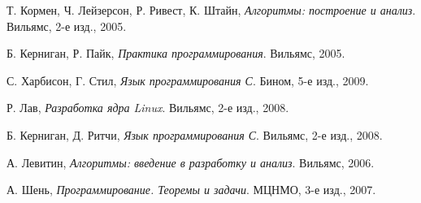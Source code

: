 \begin{thebibliography}{9}

  Т. Кормен, Ч. Лейзерсон, Р. Ривест, К. Штайн,
  \emph{Алгоритмы: построение и анализ}.
  Вильямс,
  2-е изд.,
  2005.

  Б. Керниган, Р. Пайк,
  \emph{Практика программирования}.
  Вильямс,
  2005.

  С. Харбисон, Г. Стил,
  \emph{Язык программирования С}.
  Бином,
  5-е изд.,
  2009.

  Р. Лав,
  \emph{Разработка ядра Linux}.
  Вильямс,
  2-е изд.,
  2008.

  Б. Керниган, Д. Ритчи,
  \emph{Язык программирования С}.
  Вильямс,
  2-е изд.,
  2008.

  А. Левитин,
  \emph{Алгоритмы: введение в разработку и анализ}.
  Вильямс,
  2006.

  А. Шень,
  \emph{Программирование. Теоремы и задачи}.
  МЦНМО,
  3-е изд.,
  2007.

\end{thebibliography}
